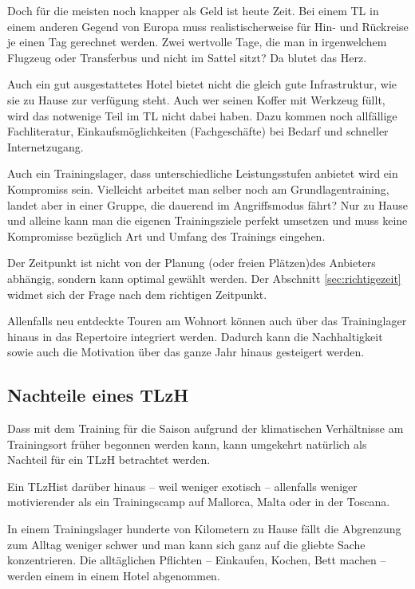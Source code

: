 \documentclass[a4paper,DIV13,BCOR0cm]{scrartcl}
\newcommand{\tlzh}{TLzH}
\begin{document}

Doch für die meisten noch knapper als Geld ist heute Zeit.
Bei einem TL in einem anderen Gegend von Europa muss realistischerweise für Hin- und Rückreise je einen Tag gerechnet werden.
Zwei wertvolle Tage, die man in irgenwelchem Flugzeug oder Transferbus und nicht im Sattel sitzt?
Da blutet das Herz.

Auch ein gut ausgestattetes Hotel bietet nicht die gleich gute Infrastruktur, wie sie zu Hause zur verfügung steht.
Auch wer seinen Koffer mit Werkzeug füllt, wird das notwenige Teil im TL nicht dabei haben.
Dazu kommen noch allfällige Fachliteratur, Einkaufsmöglichkeiten (Fachgeschäfte) bei Bedarf und schneller Internetzugang.

Auch ein Trainingslager, dass unterschiedliche Leistungsstufen anbietet wird ein Kompromiss sein.
Vielleicht arbeitet man selber noch am Grundlagentraining, landet aber in einer Gruppe, die dauerend im Angriffsmodus fährt?
Nur zu Hause und alleine kann man die eigenen Trainingsziele perfekt umsetzen und muss keine Kompromisse bezüglich Art und Umfang des Trainings eingehen.

Der Zeitpunkt ist nicht von der Planung (oder freien Plätzen)des Anbieters abhängig, sondern kann optimal gewählt werden.
Der Abschnitt \ref{sec:richtigezeit} widmet sich der Frage nach dem richtigen Zeitpunkt.

Allenfalls neu entdeckte Touren am Wohnort können auch über das Traininglager hinaus in das Repertoire integriert werden.
Dadurch kann die Nachhaltigkeit sowie auch die Motivation über das ganze Jahr hinaus gesteigert werden.

\subsection{Nachteile eines \tlzh}

Dass mit dem Training für die Saison aufgrund der klimatischen Verhältnisse am Trainingsort früher begonnen werden kann,
kann umgekehrt natürlich als Nachteil für ein \tlzh{} betrachtet werden.

Ein \tlzh ist darüber hinaus -- weil weniger exotisch -- allenfalls weniger motivierender als ein Trainingscamp auf Mallorca, Malta oder in der Toscana.

In einem Trainingslager hunderte von Kilometern zu Hause fällt die Abgrenzung zum Alltag weniger schwer und
man kann sich ganz auf die gliebte Sache konzentrieren.
Die alltäglichen Pflichten -- Einkaufen, Kochen, Bett machen -- werden einem in einem Hotel abgenommen.
\end{document}

